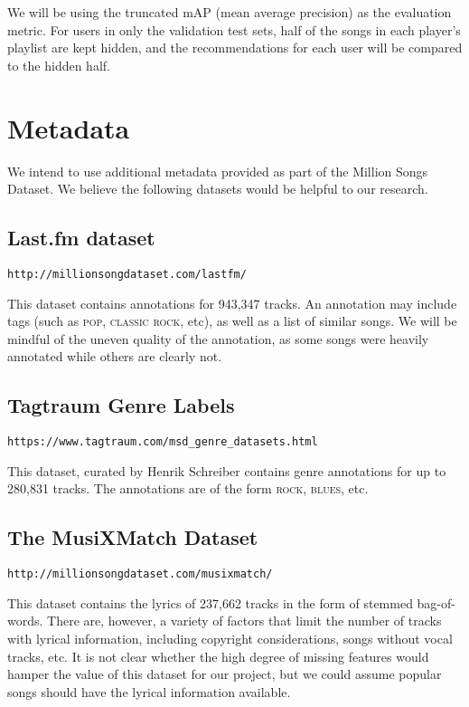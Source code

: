 \documentclass[conference]{IEEEtran}
\begin{document}


We will be using the truncated mAP (mean average precision) as the evaluation metric. For users in only the validation test sets, half of the songs in each player's playlist are kept hidden, and the recommendations for each user will be compared to the hidden half. 

\section{Metadata}

We intend to use additional metadata provided as part of the Million Songs Dataset. We believe the following datasets would be helpful to our research.

\subsection{Last.fm dataset \cite{bertin2011million}}

{\small \texttt{http://millionsongdataset.com/lastfm/}}

This dataset contains annotations for 943,347 tracks. An annotation may include tags (such as
\textsc{pop}, \textsc{classic rock}, etc), as well as a list of similar songs. We will be mindful of the uneven quality of the annotation, as some songs were heavily annotated while others are clearly not.

\subsection{Tagtraum Genre Labels}

{\small \texttt{https://www.tagtraum.com/msd\_genre\_datasets.html}}

This dataset, curated by Henrik Schreiber \cite{schreiber2015improving}
contains genre annotations for up to 280,831 tracks.
The annotations are of the form \textsc{rock}, \textsc{blues}, etc.

\subsection{The MusiXMatch Dataset}

{\small \texttt{http://millionsongdataset.com/musixmatch/}}

This dataset contains the lyrics of 237,662 tracks in the form of stemmed bag-of-words. There are, however, a variety of factors that limit the number of tracks with lyrical information, including copyright considerations, songs without vocal tracks, etc. It is not clear whether the high degree of missing features would hamper the value of this dataset for our project, but we could assume popular songs should have the lyrical information available.
\end{document}
